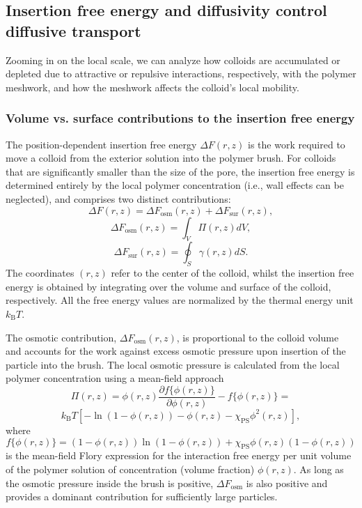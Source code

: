 \documentclass[12pt, a4paper]{article}
\begin{document}
\subsection{Insertion free energy and diffusivity control diffusive transport}

Zooming in on the local scale, we can analyze how colloids are accumulated or depleted due to attractive or repulsive interactions, respectively, with the polymer meshwork, and how the meshwork affects the colloid's local mobility.


\subsubsection{Volume vs. surface contributions to the insertion free energy}

The position-dependent insertion free energy $\Delta F(r,z)$ is the work required to move a colloid from the exterior solution into the polymer brush.
For colloids that are significantly smaller than the size of the pore, the insertion free energy is determined entirely by the local polymer concentration (i.e., wall effects can be neglected), and comprises two distinct contributions:
\begin{equation}
    \Delta F (r,z)= \Delta F_{\text{osm}}(r,z) + \Delta F_{\text{sur}}(r,z),
    \label{eq:Delta_F}
\end{equation}
$$
\Delta F_{\text{osm}}(r,z) = \int_{V} \Pi(r,z) dV,
$$
$$
\Delta F_{\text{sur}}(r,z) = \oint_{S} \gamma (r,z) dS.
$$
The coordinates $(r,z)$ refer to the center of the colloid, whilst the insertion free energy is obtained by integrating over the volume and surface of the colloid, respectively. All the free energy values are normalized by the thermal energy unit $k_{\text{B}}T$.

The osmotic contribution, $\Delta F_{\text{osm}}(r,z)$, is proportional to the colloid volume and accounts for the work against excess osmotic pressure upon insertion of the particle into the brush.
The local osmotic pressure is calculated from the local polymer concentration using a mean-field approach
$$
\Pi(r,z)=  \phi(r,z)\frac{\partial f\{\phi(r,z)\}}{\partial \phi(r,z)} - f\{\phi(r,z)\}= 
$$
\begin{equation}
	k_{\text{B}}T[-\ln(1-\phi(r,z)) - \phi(r,z) -\chi_{\text{PS}}\phi^2(r,z)],
\end{equation}
where
$$
f\{\phi(r,z)\}=(1-\phi(r,z))\ln(1-\phi(r,z)) +\chi_{\text{PS}}\phi(r,z)(1-\phi(r,z))
$$
is the mean-field Flory expression for the interaction free energy per unit volume of the polymer solution of concentration (volume fraction) $\phi(r,z)$.
As long as the osmotic pressure inside the brush is positive, $\Delta F_{\text{osm}}$ is also positive and provides a dominant contribution for sufficiently large particles.
\end{document}
